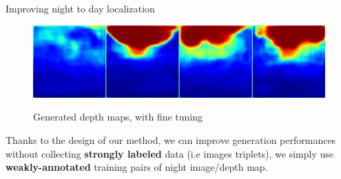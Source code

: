 \begin{frame}{Improving night to day localization}
		\vspace{-0.5cm}
		\begin{figure}
			\centering
			\begin{minipage}{0.6\linewidth}
				\includegraphics[width=0.9\linewidth]{im/res/night_ft}
			\end{minipage}
			\begin{minipage}{0.35\linewidth}
				\raggedright
				Generated depth maps, with fine tuning
			\end{minipage}
		\end{figure}

	\vfill

		Thanks to the design of our method, we can improve generation performances without collecting \textbf{strongly labeled} data (i.e images triplets), we simply use \textbf{weakly-annotated} training pairs of night image/depth map.

\end{frame}

